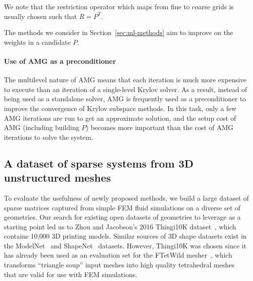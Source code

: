 \documentclass{svproc}
\begin{document}


We note that the restriction operator which maps from fine to coarse grids is usually chosen such that $R = P^{T}$.

The methods we consider in Section~\ref{sec:ml-methods} aim to improve on the weights in a candidate $P$.


\paragraph{Use of AMG as a preconditioner}
The multilevel nature of AMG means that each iteration is much more expensive to execute than an iteration of a single-level Krylov solver. As a result, instead of being used as a standalone solver, AMG is frequently used as a preconditioner to improve the convergence of Krylov subspace methods. In this task, only a few AMG iterations are run to get an approximate solution, and the setup cost of AMG (including building $P$) becomes more important than the cost of AMG iterations to solve the system.

\subsection{A dataset of sparse systems from 3D unstructured meshes}
\label{sec:dataset}
To evaluate the usefulness of newly proposed methods, we build a large dataset of sparse matrices captured from simple FEM fluid simulations on a diverse set of geometries. Our search for existing open datasets of geometries to leverage as a starting point led us to Zhou and Jacobson's 2016 Thingi10K dataset~\cite{zhou2016thingi10k}, which contains 10,000 3D printing models. Similar sources of 3D shape datasets exist in the ModelNet~\cite{modelnet} and ShapeNet~\cite{chang2015shapenet} datasets. However, Thingi10K was chosen since it has already been used as an evaluation set for the  FTetWild mesher~\cite{ftetwild}, which transforms ``triangle soup'' input meshes into high quality tetrahedral meshes that are valid for use with FEM simulations.
\end{document}
